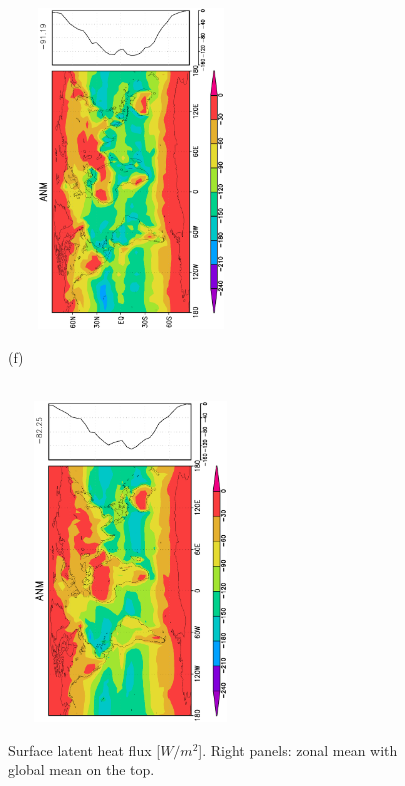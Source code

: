 \documentclass[12pt,a4paper,twoside,openright,headinclude,liststotoc,bibtotoc]{scrreprt}
\begin{document}
\begin{appendix}
\begin{figure}[b]
{\includegraphics[height=8.5cm,width=6.5cm,angle=-90]
{eps/zonaltmslhflu147.eps}
}
\parbox{8.5cm}{\hspace{0.25cm}\begin{scriptsize} (f)\end{scriptsize} \vspace{-0.5cm} \\
\includegraphics[height=8.5cm,width=6.5cm,angle=-90]
{eps/zonalt21tmslhfl147final.eps}
}
\caption[Surface latent heat flux]{Surface latent heat flux [$W/m^{2}$]. Right panels: zonal mean with global mean on the top.}
\label{img:slhfl}
\end{figure}



\end{appendix}
\end{document}
